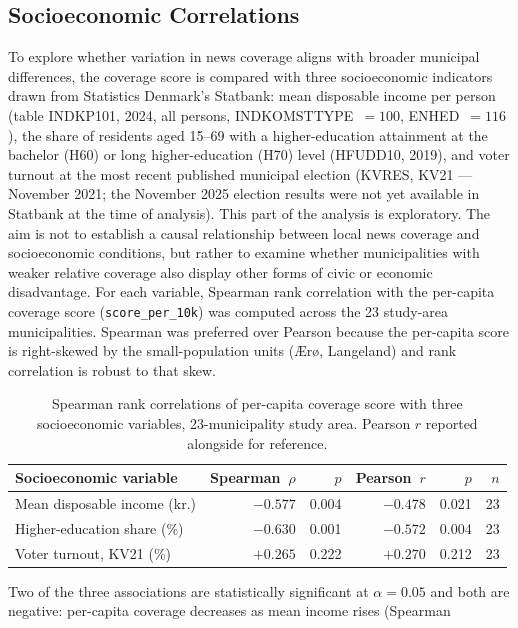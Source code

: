 \documentclass[12pt, a4paper]{article}
\begin{document}
\subsection{Socioeconomic Correlations}
To explore whether variation in news coverage aligns with broader municipal
differences, the coverage score is compared with three socioeconomic indicators
drawn from Statistics Denmark's Statbank: mean disposable income per person (table
INDKP101, 2024, all persons, INDKOMSTTYPE~$=100$, ENHED~$=116$), the share of
residents aged 15--69 with a higher-education attainment at the bachelor (H60) or
long higher-education (H70) level (HFUDD10, 2019), and voter turnout at the most
recent published municipal election (KVRES, KV21 --- November 2021; the November
2025 election results were not yet available in Statbank at the time of analysis).
This part of the analysis is exploratory. The aim is not to establish a causal
relationship between local news coverage and socioeconomic conditions, but rather
to examine whether municipalities with weaker relative coverage also display other
forms of civic or economic disadvantage.
For each variable, Spearman rank correlation with the per-capita coverage score
(\texttt{score\_per\_10k}) was computed across the 23 study-area municipalities.
Spearman was preferred over Pearson because the per-capita score is right-skewed by
the small-population units (Ærø, Langeland) and rank correlation is robust to that
skew.
\begin{table}[h]
\centering
\caption{Spearman rank correlations of per-capita coverage score with three
socioeconomic variables, 23-municipality study area. Pearson $r$ reported alongside
for reference.}
\label{tab:correlations}
\begin{tabular}{lrrrrr}
\toprule
\textbf{Socioeconomic variable} & \textbf{Spearman~$\rho$} & \textbf{$p$}
                                & \textbf{Pearson~$r$} & \textbf{$p$}
                                & \textbf{$n$} \\
\midrule
Mean disposable income (kr.) & $-0.577$ & 0.004 & $-0.478$ & 0.021 & 23 \\
Higher-education share (\%)  & $-0.630$ & 0.001 & $-0.572$ & 0.004 & 23 \\
Voter turnout, KV21 (\%)     & $+0.265$ & 0.222 & $+0.270$ & 0.212 & 23 \\
\bottomrule
\end{tabular}
\end{table}
Two of the three associations are statistically significant at $\alpha = 0.05$ and
both are negative: per-capita coverage decreases as mean income rises (Spearman
\end{document}
